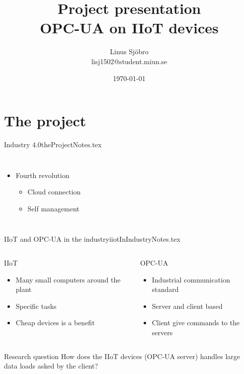 \documentclass{beamer}
\title{Project presentation \\ \small{
  OPC-UA on IIoT devices
}}
\date{\today}
\author{\Large{Linus Sjöbro} \\ \small{
  lisj1502@student.miun.se
}}
\institute{Mid Sweden University - Sundsvall}
\begin{document}
\maketitle


\section{The project}
\begin{notedFrame}{Industry 4.0}{theProjectNotes.tex}
  \begin{columns}[T, onlytextwidth]
        \begin{itemize}
			\item Fourth revolution
			\begin{itemize}
				\item Cloud connection
				\item Self management
			\end{itemize}
        \end{itemize}


  \end{columns}
\end{notedFrame}

\begin{notedFrame}{IIoT and OPC-UA in the industry}{iiotInIndustryNotes.tex}
	\begin{columns}[T, onlytextwidth]
      		\begin{block}{IIoT}
        		\begin{itemize}
          			\item Many small computers around the plant
          			\item Specific tasks
          			\item Cheap devices is a benefit
        		\end{itemize}
      		\end{block}
  
    \pause
      \begin{block}{OPC-UA}
        \begin{itemize}
          \item Industrial communication standard
          \item Server and client based
          \item Client give commands to the servers
        \end{itemize}
      \end{block}
  \end{columns}
  \pause

  \begin{block}{Research question}
	  How does the IIoT devices (OPC-UA server) handles large data loads asked by the client?
  \end{block}
\end{notedFrame}
\end{document}
